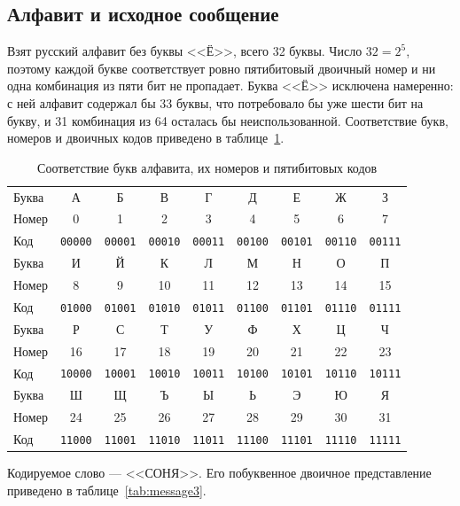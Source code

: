 \documentclass[a4paper,14pt]{extarticle}
\begin{document}
\subsection{Алфавит и исходное сообщение}

Взят русский алфавит без буквы <<Ё>>, всего 32 буквы. Число $32 = 2^5$, поэтому
каждой букве соответствует ровно пятибитовый двоичный номер и ни одна комбинация из
пяти бит не пропадает. Буква <<Ё>> исключена намеренно: с ней алфавит содержал бы 33
буквы, что потребовало бы уже шести бит на букву, и 31 комбинация из 64 осталась бы
неиспользованной. Соответствие букв, номеров и двоичных кодов приведено
в таблице~\ref{tab:alphabet3}.

\begin{table}[H]
\caption{Соответствие букв алфавита, их номеров и пятибитовых кодов}
\label{tab:alphabet3}
\centering\footnotesize\setlength{\tabcolsep}{4pt}
\begin{tabular}{l|cccccccc}
\toprule
Буква & А & Б & В & Г & Д & Е & Ж & З \\
Номер & 0 & 1 & 2 & 3 & 4 & 5 & 6 & 7 \\
Код & \texttt{00000} & \texttt{00001} & \texttt{00010} & \texttt{00011} & \texttt{00100} & \texttt{00101} & \texttt{00110} & \texttt{00111} \\
\midrule
Буква & И & Й & К & Л & М & Н & О & П \\
Номер & 8 & 9 & 10 & 11 & 12 & 13 & 14 & 15 \\
Код & \texttt{01000} & \texttt{01001} & \texttt{01010} & \texttt{01011} & \texttt{01100} & \texttt{01101} & \texttt{01110} & \texttt{01111} \\
\midrule
Буква & Р & С & Т & У & Ф & Х & Ц & Ч \\
Номер & 16 & 17 & 18 & 19 & 20 & 21 & 22 & 23 \\
Код & \texttt{10000} & \texttt{10001} & \texttt{10010} & \texttt{10011} & \texttt{10100} & \texttt{10101} & \texttt{10110} & \texttt{10111} \\
\midrule
Буква & Ш & Щ & Ъ & Ы & Ь & Э & Ю & Я \\
Номер & 24 & 25 & 26 & 27 & 28 & 29 & 30 & 31 \\
Код & \texttt{11000} & \texttt{11001} & \texttt{11010} & \texttt{11011} & \texttt{11100} & \texttt{11101} & \texttt{11110} & \texttt{11111} \\
\bottomrule
\end{tabular}
\end{table}

Кодируемое слово --- <<СОНЯ>>. Его побуквенное двоичное представление приведено
в таблице~\ref{tab:message3}.
\end{document}
